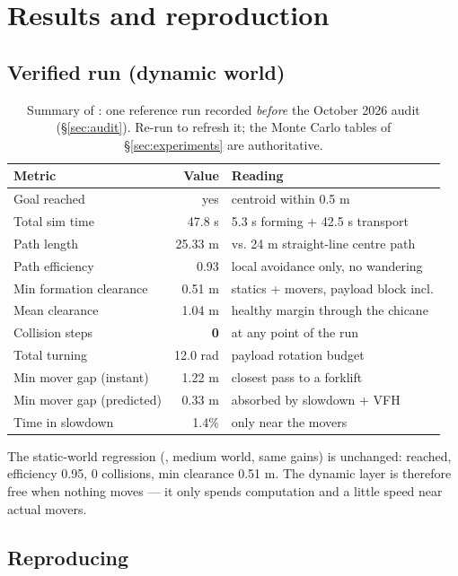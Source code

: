 \section{Results and reproduction}

\subsection{Verified run (dynamic world)}

\begin{table}[h]
\centering
\footnotesize
\begin{tabular}{@{}lrl@{}}
\toprule
\textbf{Metric} & \textbf{Value} & \textbf{Reading}\\\midrule
Goal reached & yes & centroid within 0.5 m\\
Total sim time & 47.8 s & 5.3 s forming + 42.5 s transport\\
Path length & 25.33 m & vs. 24 m straight-line centre path\\
Path efficiency & 0.93 & local avoidance only, no wandering\\
Min formation clearance & 0.51 m & statics + movers, payload block incl.\\
Mean clearance & 1.04 m & healthy margin through the chicane\\
Collision steps & \textbf{0} & at any point of the run\\
Total turning & 12.0 rad & payload rotation budget\\
Min mover gap (instant) & 1.22 m & closest pass to a forklift\\
Min mover gap (predicted) & 0.33 m & absorbed by slowdown + VFH\\
Time in slowdown & 1.4\% & only near the movers\\
\bottomrule
\end{tabular}
\caption{Summary of : one reference run recorded
\emph{before} the October 2026 audit (\S\ref{sec:audit}). Re-run
 to refresh it; the Monte Carlo tables of
\S\ref{sec:experiments} are authoritative.}
\end{table}

The static-world regression (, medium world, same
gains) is unchanged: reached, efficiency 0.95, 0 collisions, min clearance
0.51 m. The dynamic layer is therefore free when nothing moves --- it only
spends computation and a little speed near actual movers.

\subsection{Reproducing}


